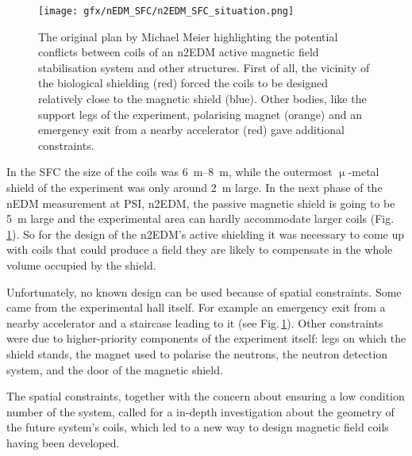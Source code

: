 \begin{figure}
  \centering
  \texttt{[image: gfx/nEDM\_SFC/n2EDM\_SFC\_situation.png]}
  \caption{The original plan by Michael Meier highlighting the potential conflicts between coils of an n2EDM active magnetic field stabilisation system and other structures. First of all, the vicinity of the biological shielding (red) forced the coils to be designed relatively close to the magnetic shield (blue). Other bodies, like the support legs of the experiment, polarising magnet (orange) and an emergency exit from a nearby accelerator (red) gave additional constraints.}
  \label{fig:n2EDM_sfc_situational_plan}
\end{figure}

In the SFC the size of the coils was \SIrange[range-phrase = --, range-units=single]{6}{8}{\meter}, while the outermost $\upmu$-metal shield of the experiment was only around \SI{2}{\meter} large. In the next phase of the nEDM measurement at PSI, n2EDM, the passive magnetic shield is going to be \SI{5}{\meter} large and the experimental area can hardly accommodate larger coils (Fig.\,\ref{fig:n2EDM_sfc_situational_plan}). So for the design of the n2EDM's active shielding it was necessary to come up with coils that could produce a field they are likely to compensate in the whole volume occupied by the shield.

Unfortunately, no known design can be used because of spatial constraints. Some came from the experimental hall itself. For example an emergency exit from a nearby accelerator and a staircase leading to it (see Fig.\,\ref{fig:n2EDM_sfc_situational_plan}). Other constraints were due to higher-priority components of the experiment itself: legs on which the shield stands, the magnet used to polarise the neutrons, the neutron detection system, and the door of the magnetic shield.

The spatial constraints, together with the concern about ensuring a low condition number of the system, called for a in-depth investigation about the geometry of the future system's coils, which led to a new way to design magnetic field coils having been developed.